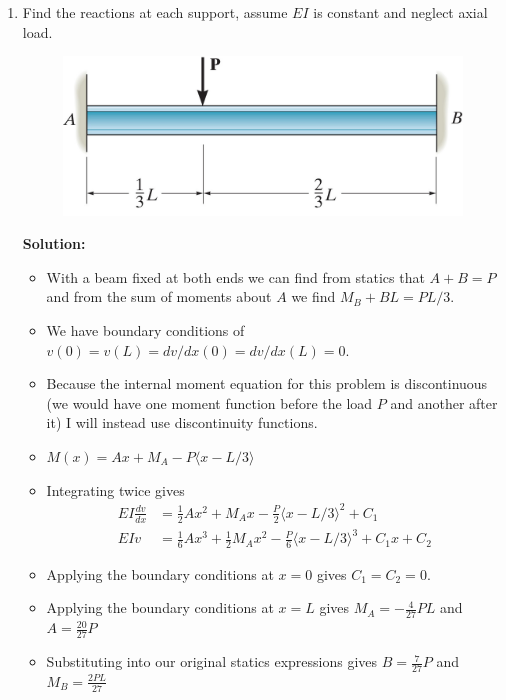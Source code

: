 \documentclass[12pt, oneside]{article}
\begin{document}
\begin{enumerate}
	\item %
		Find the reactions at each support, assume $EI$ is constant and neglect axial load.
		\begin{figure}[H]
			\centering
			\includegraphics[width=0.6\linewidth]{12-99}
		\end{figure}
			\textbf{Solution:}
			\begin{itemize}
				\item With a beam fixed at both ends we can find from statics that $A + B = P$ and from the sum of moments about $A$ we find $M_B + BL = PL/3$.
				\item We have boundary conditions of $v(0) = v(L) = dv/dx(0) = dv/dx(L) = 0$.
				\item Because the internal moment equation for this problem is discontinuous (we would have one moment function before the load $P$ and another after it) I will instead use discontinuity functions.
				\item $M(x) = Ax + M_A - P \langle x-L/3 \rangle$
				\item Integrating twice gives
					\begin{align*}
						EI \frac{dv}{dx} &= \frac{1}{2} Ax^2 + M_A x - \frac{P}{2} \langle x-L/3 \rangle^2 + C_1\\
						EI v &= \frac{1}{6} Ax^3 + \frac{1}{2} M_A x^2 - \frac{P}{6} \langle x-L/3 \rangle^3 + C_1x + C_2
					\end{align*}
				\item Applying the boundary conditions at $x=0$ gives $C_1 = C_2 = 0$.
				\item Applying the boundary conditions at $x=L$ gives $M_A = -\frac{4}{27}PL$ and $A = \frac{20}{27}P$
				\item Substituting into our original statics expressions gives $B = \frac{7}{27}P$ and $M_B = \frac{2PL}{27}$
			\end{itemize}


\end{enumerate}
\end{document}
